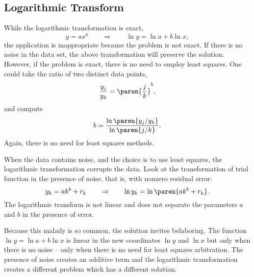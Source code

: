 \subsection{Logarithmic Transform}  %
While the logarithmic transformation is exact,
  \begin{equation*}   %
      y = a x^{b} \qquad \Rightarrow \qquad \ln y = \ln a + b \ln x,
  \end{equation*}
the application is inappropriate because the problem is not exact. If there is no noise in the data set, the above transformation will preserve the solution. However, if the problem is exact, there is no need to employ least squares. One could take the ratio of two distinct data points,
  \begin{equation*}   %
      \frac{y_{j}}{y_{k}} = \paren{\frac{j}{k}}^{b},
  \end{equation*}
and compute
  \begin{equation*}   %
      b = \frac{\ln \paren{y_{j} / y_{k}}} {\ln \paren{j /k}}.
  \end{equation*}
Again, there is no need for least squares methods.

When the data contains noise, and the choice is to use least squares, the logarithmic transformation corrupts the data. Look at the transformation of trial function in the presence of noise, that is, with nonzero residual error:
  \begin{equation*}   %
      y_{k} = a k^{b} + r_{k}  \qquad \Rightarrow \qquad \ln y_{k} = \ln \paren{a k^{b} + r_{k}}.
  \end{equation*}
The logarithmic transform is not linear and does not separate the parameters $a$ and $b$ in the presence of error.

Because this malady is so common, the solution invites belaboring. The function $\ln y = \ln a + b \ln x$ is linear in the new coordinates $\ln y$ and $\ln x$ but only when there is no noise -- only when there is no need for least squares arbitration. The presence of noise creates an additive term and the logarithmic transformation creates a different problem which has a different solution.


